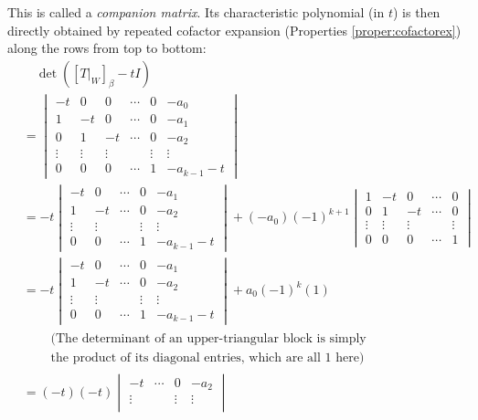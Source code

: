 This is called a \textit{companion matrix}. Its characteristic polynomial (in $t$) is then directly obtained by repeated cofactor expansion (Properties \ref{proper:cofactorex}) along the rows from top to bottom:
\begin{align}
&\quad \det([T|_W]_\beta - t I) \nonumber \\
&= \begin{vmatrix}
-t & 0 & 0 & \cdots & 0 & -a_0 \\
1 & -t & 0 & \cdots & 0 & -a_1 \\
0 & 1 & -t & \cdots & 0 & -a_2 \\
\vdots & \vdots & \vdots & & \vdots & \vdots \\
0 & 0 & 0 & \cdots & 1 & -a_{k-1}-t
\end{vmatrix} \nonumber \\
&=
-t
\begin{vmatrix}
-t & 0 & \cdots & 0 & -a_1 \\
1 & -t & \cdots & 0 & -a_2 \\
\vdots & \vdots  & & \vdots & \vdots \\
0 & 0 & \cdots & 1 & -a_{k-1}-t
\end{vmatrix}
+ (-a_0) (-1)^{k+1}
\begin{vmatrix}
1 & -t & 0 & \cdots & 0 \\
0 & 1 & -t & \cdots & 0 \\
\vdots & \vdots & \vdots & & \vdots \\
0 & 0 & 0 & \cdots & 1 
\end{vmatrix} \nonumber \\
&= -t
\begin{vmatrix}
-t & 0 & \cdots & 0 & -a_1 \\
1 & -t & \cdots & 0 & -a_2 \\
\vdots & \vdots  & & \vdots & \vdots \\
0 & 0 & \cdots & 1 & -a_{k-1}-t
\end{vmatrix}
+ a_0 (-1)^k (1) \nonumber \\
&\quad 
\begin{aligned}
&\text{(The determinant of an upper-triangular block is simply} \\    
&\text{the product of its diagonal entries, which are all $1$ here)}
\end{aligned} \nonumber \\
&= (-t)(-t)
\begin{vmatrix}
-t & \cdots & 0 & -a_2 \\
\vdots & & \vdots & \vdots \\

\end{vmatrix}
\end{align}
